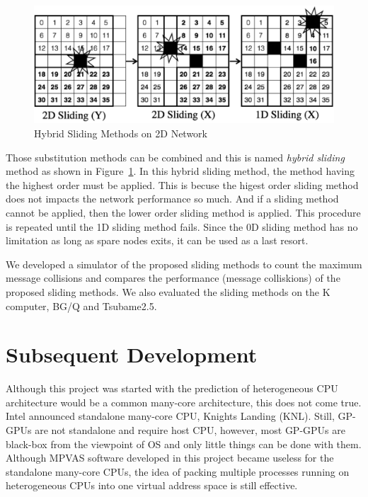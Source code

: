 \begin{figure}[ht]
\begin{center}
\includegraphics[width=0.95\columnwidth]{Figs/HybridSliding.pdf}
  \caption{Hybrid Sliding Methods on 2D Network}
  \label{fig:hybrid-methods}
\end{center}
\end{figure}

Those substitution methods can be combined and this is named {\em
hybrid sliding} method as shown in Figure~\ref{fig:hybrid-methods}. In
this hybrid sliding method, the method having the highest order must
be applied. This is becuse the higest order sliding method does not
impacts the network performance so much. 
And if a sliding method cannot be applied, then the
lower order sliding method is applied. This procedure is repeated
until the 1D sliding method fails.
Since the 0D sliding method has no
limitation as long as spare nodes exits, it can be used as a last resort.

We developed a simulator of the proposed sliding methods to count the 
maximum message collisions and compares the performance (message
colliskions) of the proposed sliding methods. We also evaluated the
sliding methods on the K computer, BG/Q and
Tsubame2.5\cite{Hori:2015:SSF:2802658.2802670}.  

\section{Subsequent Development}

Although this project was started with the prediction of
heterogeneous CPU architecture would be a common many-core
architecture, this does not come true. Intel announced standalone
many-core CPU, Knights Landing (KNL). Still, GP-GPUs are not
standalone and require host CPU, however, most GP-GPUs are black-box
from the viewpoint of OS and only little things can be done with
them. Although MPVAS software developed in this project became
useless for the standalone many-core CPUs, the idea of packing
multiple processes running on heterogeneous CPUs into one virtual
address space is still effective.

